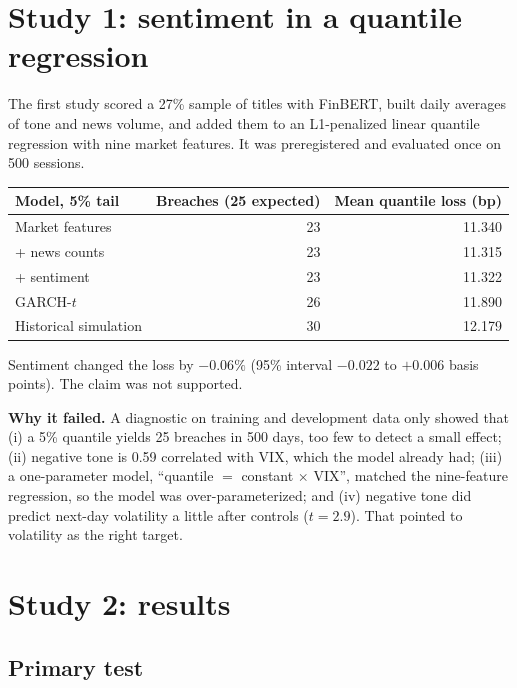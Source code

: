 \documentclass[11pt,a4paper]{article}
\begin{document}
\section{Study 1: sentiment in a quantile regression}

The first study scored a 27\% sample of titles with FinBERT, built daily averages of tone and
news volume, and added them to an L1-penalized linear quantile regression with nine market
features. It was preregistered and evaluated once on 500 sessions.

\begin{center}
\begin{tabular}{@{}lrr@{}}
\toprule
\textbf{Model, 5\% tail} & \textbf{Breaches (25 expected)} & \textbf{Mean quantile loss (bp)} \\
\midrule
Market features & 23 & 11.340 \\
+ news counts & 23 & 11.315 \\
+ sentiment & 23 & 11.322 \\
GARCH-$t$ & 26 & 11.890 \\
Historical simulation & 30 & 12.179 \\
\bottomrule
\end{tabular}
\end{center}

Sentiment changed the loss by $-0.06\%$ (95\% interval $-0.022$ to $+0.006$ basis points).
The claim was not supported.

\textbf{Why it failed.} A diagnostic on training and development data only showed that
(i) a 5\% quantile yields 25 breaches in 500 days, too few to detect a small effect;
(ii) negative tone is 0.59 correlated with VIX, which the model already had;
(iii) a one-parameter model, ``quantile $=$ constant $\times$ VIX'', matched the nine-feature
regression, so the model was over-parameterized; and (iv) negative tone did predict next-day
volatility a little after controls ($t=2.9$). That pointed to volatility as the right target.

\section{Study 2: results}

\subsection{Primary test}
\end{document}
